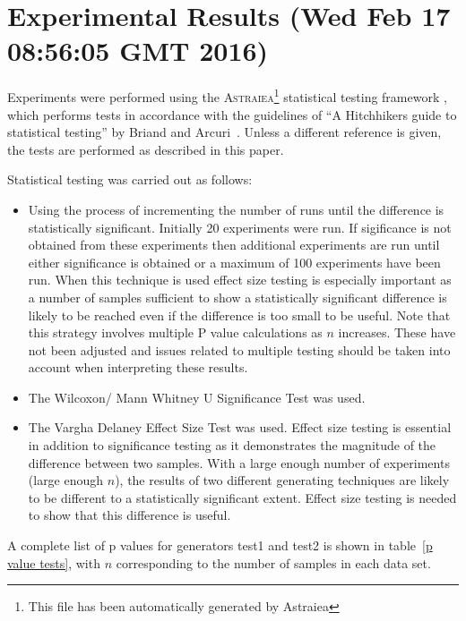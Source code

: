 \documentclass[]{article}
\begin{document}
\section{Experimental Results (Wed Feb 17 08:56:05 GMT 2016)}
Experiments were performed using the \textsc{Astraiea}\footnote{This file has been automatically generated by Astraiea} statistical testing framework \cite{Neumann:2014:EET:2598394.2609850},
which performs tests in accordance with the guidelines of ``A Hitchhikers guide to statistical testing''
by Briand and Arcuri~\cite{Arcuri2012}.
Unless a different reference is given, the tests are performed as described in this paper.



Statistical testing was carried out as follows: 
\begin{itemize}
\item{Using the process of incrementing the number of runs until the difference is statistically significant. Initially 20 experiments were run. If sigificance is not obtained from these experiments then additional experiments are run until either significance is obtained or a maximum of 100 experiments have been run. When this technique is used effect size testing is especially important as a number of samples sufficient to show a statistically significant difference is likely to be reached even if the difference is too small to be useful. Note that this strategy involves multiple P value calculations as $n$ increases. These have not been adjusted and issues related to multiple testing should be taken into account when interpreting these results.
}
\item{The Wilcoxon/ Mann Whitney U Significance Test was used.}
\item{The Vargha Delaney Effect Size Test was used. Effect size testing is essential in addition to significance testing as it demonstrates the magnitude of the difference between two samples. With a large enough number of experiments (large enough $n$), the results of two different generating techniques are likely to be different to a statistically significant extent. Effect size testing is needed to show that this difference is useful.}
\end{itemize}A complete list of p values for generators test1 and test2 is shown in table~\ref{p value tests}, with $n$ corresponding to the number of samples in each data set.
\end{document}
